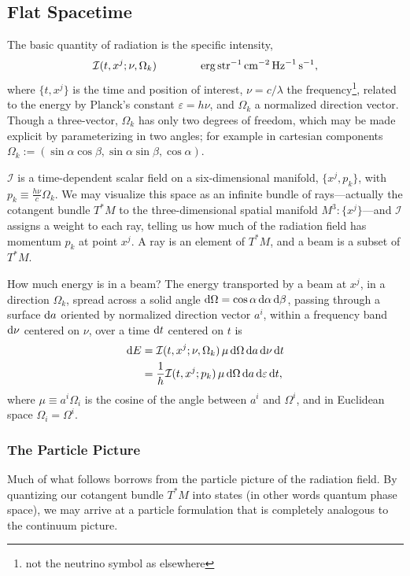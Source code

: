 \subsection{Flat Spacetime}
The basic quantity of radiation is the specific intensity,
\begin{equation}
  \mathcal{I}(t,x^j;\nu,\Omega_k) \qquad \qquad
  {\rm erg}\,{\rm str}^{-1}\,{\rm cm}^{-2}\,{\rm Hz}^{-1}\,{\rm s}^{-1}, \nonumber
\end{equation}
where $\{t,x^j\}$ is the time and position of interest,
$\nu=c/\lambda$ the frequency\footnote{not the neutrino symbol as elsewhere},
related to the energy by Planck's constant $\varepsilon=h\nu$, and
$\Omega_k$ a normalized direction vector. Though a three-vector, $\Omega_k$
has only two degrees of freedom, which may be made explicit by parameterizing
in two angles; for example in cartesian components
$\Omega_k:=(\sin\alpha\cos\beta,\sin\alpha\sin\beta,\cos\alpha)$.

$\mathcal{I}$ is a time-dependent scalar field on a six-dimensional manifold,
$\{x^j,p_k\}$, with $p_k\equiv\frac{h\nu}{c}\Omega_k$.
We may visualize this space as an infinite bundle of rays---actually the
cotangent bundle $T^*M$ to the three-dimensional
spatial manifold $M^3:\{x^j\}$---and $\mathcal{I}$
assigns a weight to each ray, telling us how much of the radiation field has
momentum $p_k$ at point $x^j$. A ray is an element of $T^*M$,
and a beam is a subset of $T^*M$.

How much energy is in a beam?
The energy transported by a beam at $x^j$,
in a direction $\Omega_k$,
spread across a solid angle $\mathrm{d}\Omega=\cos\alpha\,\mathrm{d}\alpha\,\mathrm{d}\beta$,
passing through a surface $\mathrm{d} a$
oriented by normalized direction vector $a^i$,
within a frequency band $\mathrm{d} \nu$ centered on $\nu$,
over a time $\mathrm{d} t$ centered on $t$ is
\begin{align}
  \label{eqn:beam_energy_I_nu}
  \mathrm{d} E &= \mathcal{I}(t,x^j;\nu,\Omega_k)\,
  \mu\, \mathrm{d}\Omega\, \mathrm{d} a\, \mathrm{d}\nu\, \mathrm{d} t \\
  \label{eqn:beam_energy_I_eps}
  &= \frac{1}{h} \mathcal{I}(t,x^j;p_k)\,
  \mu\, \mathrm{d}\Omega\, \mathrm{d} a\, \mathrm{d}\varepsilon\, \mathrm{d} t,
\end{align}
where $\mu\equiv a^i\Omega_i$ is the cosine of the angle between $a^i$ and
$\Omega^i$, and in Euclidean space $\Omega_i=\Omega^i$.

\subsubsection{The Particle Picture}
Much of what follows borrows from the particle picture of the radiation field.
By quantizing our cotangent bundle $T^*M$ into states (in other words
quantum phase space), we may arrive at a particle formulation that is completely
analogous to the continuum picture.

